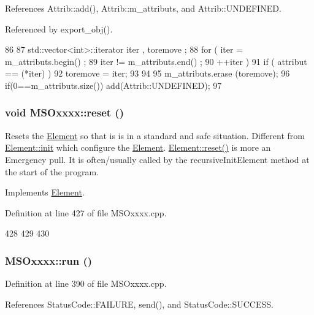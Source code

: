 References Attrib::add(), Attrib::m\_\-attributs, and Attrib::UNDEFINED.

Referenced by export\_\-obj().


\begin{DoxyCode}
86                                {
87     std::vector<int>::iterator iter , toremove ;
88     for ( iter  = m_attributs.begin() ;
89           iter != m_attributs.end()   ;
90           ++iter ) {
91       if ( attribut == (*iter) ) {
92         toremove = iter;
93       }
94     }
95     m_attributs.erase (toremove);
96     if(0==m_attributs.size()) add(Attrib::UNDEFINED);
97   }
\end{DoxyCode}
\hypertarget{classMSOxxxx_a26f03d21da556529155898dc115c301c}{
\subsubsection[{reset}]{\setlength{\rightskip}{0pt plus 5cm}void MSOxxxx::reset ()}}
\label{classMSOxxxx_a26f03d21da556529155898dc115c301c}
Resets the \hyperlink{classElement}{Element} so that is is in a standard and safe situation. Different from \hyperlink{classElement_af42754b5cabc198869222725218d695c}{Element::init} which configure the \hyperlink{classElement}{Element}. \hyperlink{classElement_a69efffa22f06909d768149715565cb56}{Element::reset()} is more an Emergency pull. It is often/usually called by the recursiveInitElement method at the start of the program. 

Implements \hyperlink{classElement_a69efffa22f06909d768149715565cb56}{Element}.

Definition at line 427 of file MSOxxxx.cpp.


\begin{DoxyCode}
428 {
429 
430 }
\end{DoxyCode}
\hypertarget{classMSOxxxx_a96ca34744e5a6b611aaf9ae7910f00cd}{
\subsubsection[{run}]{ MSOxxxx::run ()}}
\label{classMSOxxxx_a96ca34744e5a6b611aaf9ae7910f00cd}


Definition at line 390 of file MSOxxxx.cpp.

References StatusCode::FAILURE, send(), and StatusCode::SUCCESS.

